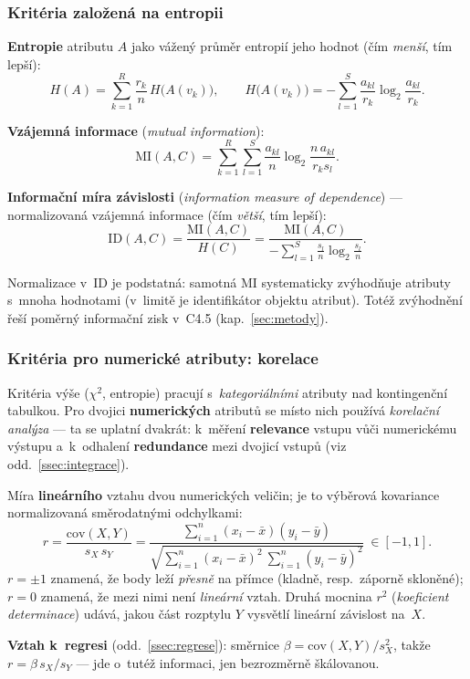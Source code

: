 \documentclass[11pt,a4paper]{article}
\theoremstyle{definition}
\begin{document}
\subsubsection{Kritéria založená na entropii}

\begin{defbox}
\textbf{Entropie} atributu $A$ jako vážený průměr entropií jeho hodnot
(čím \emph{menší}, tím lepší):
\[ H(A)=\sum_{k=1}^{R}\frac{r_k}{n}\,H\big(A(v_k)\big),\qquad
   H\big(A(v_k)\big)=-\sum_{l=1}^{S}\frac{a_{kl}}{r_k}\log_2\frac{a_{kl}}{r_k}. \]

\textbf{Vzájemná informace} (\emph{mutual information}):
\[ \mathrm{MI}(A,C)=\sum_{k=1}^{R}\sum_{l=1}^{S}\frac{a_{kl}}{n}
   \log_2\frac{n\,a_{kl}}{r_k s_l}. \]

\textbf{Informační míra závislosti} (\emph{information measure of dependence}) ---
normalizovaná vzájemná informace (čím \emph{větší}, tím lepší):
\[ \mathrm{ID}(A,C)=\frac{\mathrm{MI}(A,C)}{H(C)}
   =\frac{\mathrm{MI}(A,C)}{-\sum_{l=1}^{S}\frac{s_l}{n}\log_2\frac{s_l}{n}}. \]
\end{defbox}

Normalizace v~$\mathrm{ID}$ je podstatná: samotná $\mathrm{MI}$ systematicky zvýhodňuje
atributy s~mnoha hodnotami (v~limitě je identifikátor objektu 
atribut). Totéž zvýhodnění řeší poměrný informační zisk v~C4.5 (kap.~\ref{sec:metody}).

\subsubsection{Kritéria pro numerické atributy: korelace}
\label{ssec:korelace}

Kritéria výše ($\chi^2$, entropie) pracují s~\emph{kategoriálními} atributy nad kontingenční
tabulkou. Pro dvojici \textbf{numerických} atributů se místo nich používá \emph{korelační
analýza} --- ta se uplatní dvakrát: k~měření \textbf{relevance} vstupu vůči numerickému
výstupu a~k~odhalení \textbf{redundance} mezi dvojicí vstupů (viz odd.~\ref{ssec:integrace}).

\begin{defbox}
Míra \textbf{lineárního} vztahu dvou numerických veličin; je to výběrová kovariance
normalizovaná směrodatnými odchylkami:
\[ r=\frac{\mathrm{cov}(X,Y)}{s_X\,s_Y}
   =\frac{\sum_{i=1}^{n}(x_i-\bar x)(y_i-\bar y)}
          {\sqrt{\sum_{i=1}^{n}(x_i-\bar x)^2\ \sum_{i=1}^{n}(y_i-\bar y)^2}}\ \in[-1,1]. \]
$r=\pm 1$ znamená, že body leží \emph{přesně} na přímce (kladně, resp.\ záporně skloněné);
$r=0$ znamená, že mezi nimi není \emph{lineární} vztah. Druhá mocnina $r^2$
(\emph{koeficient determinace}) udává, jakou část rozptylu $Y$ vysvětlí lineární závislost
na~$X$.

\textbf{Vztah k~regresi} (odd.~\ref{ssec:regrese}): směrnice $\beta=\mathrm{cov}(X,Y)/s_X^2$,
takže $r=\beta\,s_X/s_Y$ --- jde o~tutéž informaci, jen bezrozměrně škálovanou.
\end{defbox}
\end{document}
